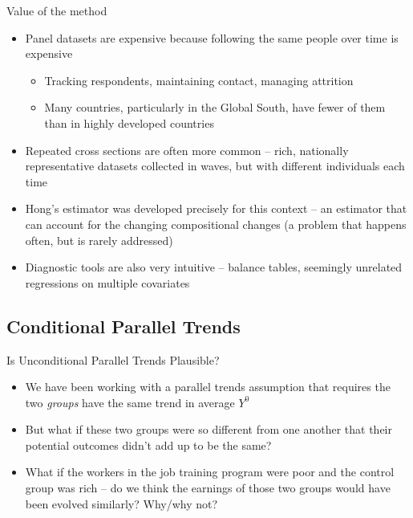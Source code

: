 \documentclass{beamer}
\begin{document}
\begin{frame}{Value of the method}

\begin{itemize}
\item Panel datasets are expensive because following the same people over time is expensive
	\begin{itemize}
	\item Tracking respondents, maintaining contact, managing attrition
	\item Many countries, particularly in the Global South, have fewer of them than in highly developed countries
	\end{itemize}
\item Repeated cross sections are often more common -- rich, nationally representative datasets collected in waves, but with different individuals each time
\item Hong's estimator was developed precisely for this context -- an estimator that can account for the changing compositional changes (a problem that happens often, but is rarely addressed)
\item Diagnostic tools are also very intuitive -- balance tables, seemingly unrelated regressions on multiple covariates

\end{itemize}

\end{frame}






\subsection{Conditional Parallel Trends}

\begin{frame}{Is Unconditional Parallel Trends Plausible?}

\begin{itemize}

\item We have been working with a parallel trends assumption that requires the two \emph{groups} have the same trend in average $Y^0$

\item But what if these two groups were so different from one another that their potential outcomes didn't add up to be the same?

\item What if the workers in the job training program were poor and the control group was rich -- do we think the earnings of those two groups would have been evolved similarly?  Why/why not?



\end{itemize}

\end{frame}
\end{document}
